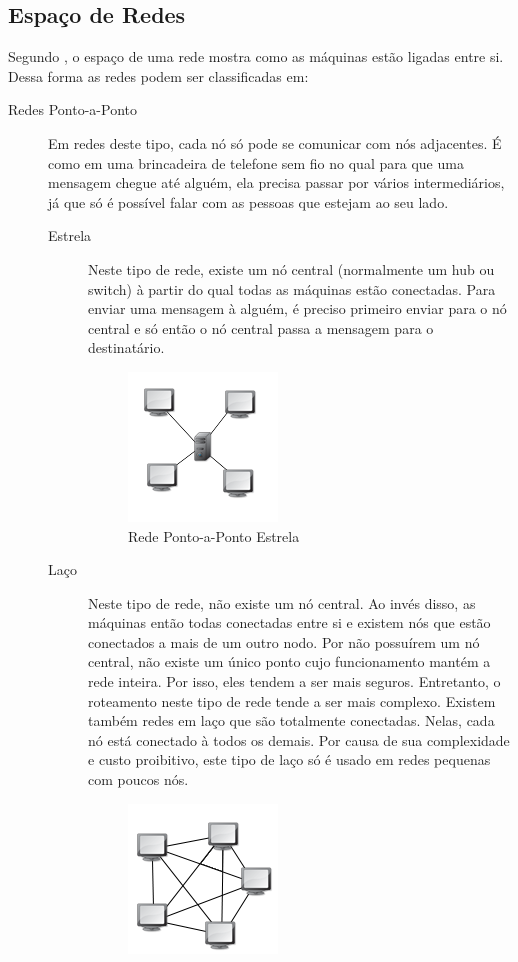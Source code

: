 	\subsection{Espaço de Redes}
	Segundo \cite{farias2006essncial}, o espaço de uma rede mostra como as máquinas estão ligadas entre si. Dessa forma as redes podem ser classificadas em:
	\begin{description}
		\item[Redes Ponto-a-Ponto] Em redes deste tipo, cada nó só pode se comunicar com nós adjacentes. É como em uma brincadeira de telefone sem fio no qual para que uma mensagem chegue até alguém, ela precisa passar por vários intermediários, já que só é possível falar com as pessoas que estejam ao seu lado.
			\begin{description}
				\item[Estrela] Neste tipo de rede, existe um nó central (normalmente um hub ou switch) à partir do qual todas as máquinas estão conectadas. Para enviar uma mensagem à alguém, é preciso primeiro enviar para o nó central e só então o nó central passa a mensagem para o destinatário.
					\begin{figure}[!htb]
						\centering
						\includegraphics{img/estrela.jpg}
						\caption{Rede Ponto-a-Ponto Estrela}
						\label{Rede Estrela}
					\end{figure}
				\item[Laço] Neste tipo de rede, não existe um nó central. Ao invés disso, as máquinas então todas conectadas entre si e existem nós que estão conectados a mais de um outro nodo. Por não possuírem um nó central, não existe um único ponto cujo funcionamento mantém a rede inteira. Por isso, eles tendem a ser mais seguros. Entretanto, o roteamento neste tipo de rede tende a ser mais complexo. Existem também redes em laço que são totalmente conectadas. Nelas, cada nó está conectado à todos os demais. Por causa de sua complexidade e custo proibitivo, este tipo de laço só é usado em redes pequenas com poucos nós.
					\begin{figure}[!htb]
						\centering
						\includegraphics{img/laco.jpg}

\end{figure}
\end{description}
\end{description}

